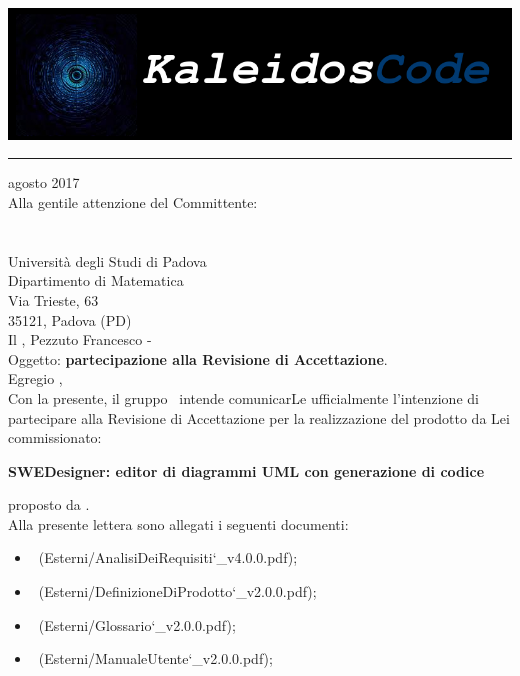 \documentclass[a4paper,12pt]{article}
\begin{document}
	\begin{titlepage}
		\includegraphics[scale=0.2]{../../../Immagini/KaleidosCodeLogo.png}
		\hrule
		\vspace{1.2cm}
		 agosto 2017\\
		\vspace{0.4cm}
		Alla gentile attenzione del Committente:\\
		\vardanega\\
		\cardin\\
		Università degli Studi di Padova\\
		Dipartimento di Matematica\\
		Via Trieste, 63\\
		35121, Padova (PD)\\
		\vspace{1.2cm}
		\flushleft Il \responsabilediprogetto, Pezzuto Francesco - \kaleidoscode\\
		\vspace{0.4cm}
		Oggetto: \textbf{partecipazione alla Revisione di Accettazione}.\\
		\vspace{1cm}
		Egregio \vardanega,\\
		\vspace{0.4cm}
		Con la presente, il gruppo \kaleidoscode\ intende comunicarLe ufficialmente l'intenzione di
		partecipare alla Revisione di Accettazione per la realizzazione del prodotto da Lei commissionato:
		\begin{center}
			\textbf{SWEDesigner: editor di diagrammi UML con generazione di codice} 
		\end{center}
		proposto da \proponente.\\
		Alla presente lettera sono allegati i seguenti documenti:
		\begin{itemize}
			\item \analisideirequisitiRA\ (Esterni/AnalisiDeiRequisiti\char`_v4.0.0.pdf);
			\item {}\ (Esterni/DefinizioneDiProdotto\char`_v2.0.0.pdf);
			\item \glossarioRA\ (Esterni/Glossario\char`_v2.0.0.pdf);
			\item \manualeutenteRA\ (Esterni/ManualeUtente\char`_v2.0.0.pdf);

\end{itemize}
\end{titlepage}
\end{document}
